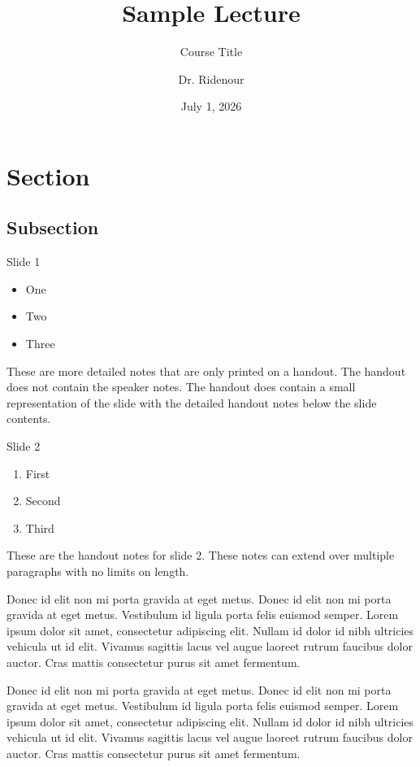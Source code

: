 \documentclass[aspectratio=169,12pt,ignorenonframetext]{beamer}
\author{Dr. Ridenour}
\date{July  1, 2026}
\title{Sample Lecture}
\subtitle{Course Title}
\institute{Department of Philosophy}
\begin{document}
\maketitle
\section{Section}
\label{sec:orgb4d4567}

\subsection{Subsection}
\label{sec:orga895343}

\begin{frame}[label={sec:org7f32200}]{Slide 1}
\begin{itemize}
\item One
\item Two
\item Three
\end{itemize}
\end{frame}
These are more detailed notes that are only printed on a handout. The handout does not contain the speaker notes. The handout does contain a small representation of the slide with the detailed handout notes below the slide contents.
\begin{frame}[label={sec:orgd51a502}]{Slide 2}
\begin{enumerate}
\item First
\item Second
\item Third
\end{enumerate}
\end{frame}
These are the handout notes for slide 2. These notes can extend over multiple paragraphs with no limits on length.

Donec id elit non mi porta gravida at eget metus. Donec id elit non mi porta gravida at eget metus. Vestibulum id ligula porta felis euismod semper. Lorem ipsum dolor sit amet, consectetur adipiscing elit. Nullam id dolor id nibh ultricies vehicula ut id elit. Vivamus sagittis lacus vel augue laoreet rutrum faucibus dolor auctor. Cras mattis consectetur purus sit amet fermentum.

Donec id elit non mi porta gravida at eget metus. Donec id elit non mi porta gravida at eget metus. Vestibulum id ligula porta felis euismod semper. Lorem ipsum dolor sit amet, consectetur adipiscing elit. Nullam id dolor id nibh ultricies vehicula ut id elit. Vivamus sagittis lacus vel augue laoreet rutrum faucibus dolor auctor. Cras mattis consectetur purus sit amet fermentum.
\end{document}
